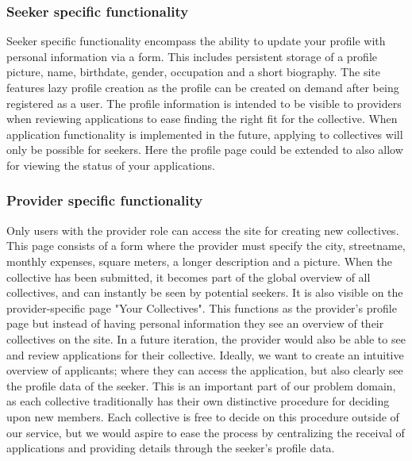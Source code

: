 \subsubsection{Seeker specific functionality}

Seeker specific functionality encompass the ability to update your profile with personal information via a form. 
This includes persistent storage of a profile picture, name, birthdate, gender, occupation and a short biography. 
The site features lazy profile creation as the profile can be created on demand after being registered as a user. 
The profile information is intended to be visible to providers when reviewing applications to ease finding the right
fit for the collective. When application functionality is implemented in the future, applying to collectives will only be possible for seekers.
Here the profile page could be extended to also allow for viewing the status of your applications.

\subsubsection{Provider specific functionality}

Only users with the provider role can access the site for creating new collectives.
This page consists of a form where the provider must specify the city, streetname, monthly expenses, square meters, a longer description and a picture.
When the collective has been submitted, it becomes part of the global overview of all collectives, and can instantly be seen by potential seekers.
It is also visible on the provider-specific page "Your Collectives".
This functions as the provider's profile page but instead of having personal information they see an overview of their collectives on the site.
In a future iteration, the provider would also be able to see and review applications for their collective. 
Ideally, we want to create an intuitive overview of applicants; where they can access the application, 
but also clearly see the profile data of the seeker. This is an important part of our problem domain, 
as each collective traditionally has their own distinctive procedure for deciding upon new members. 
Each collective is free to decide on this procedure outside of our service, but
we would aspire to ease the process by centralizing the receival of applications and providing details through the seeker's profile data.








